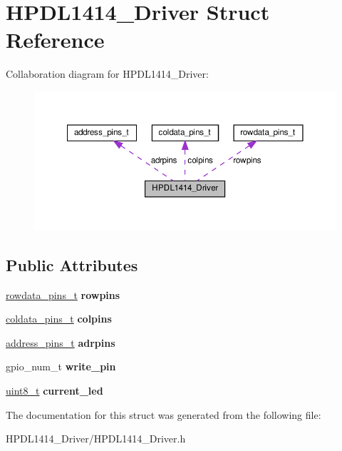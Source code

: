 \hypertarget{structHPDL1414__Driver}{}\section{H\+P\+D\+L1414\+\_\+\+Driver Struct Reference}
\label{structHPDL1414__Driver}


Collaboration diagram for H\+P\+D\+L1414\+\_\+\+Driver\+:\nopagebreak
\begin{figure}[H]
\begin{center}
\leavevmode
\includegraphics[width=350pt]{structHPDL1414__Driver__coll__graph}
\end{center}
\end{figure}
\subsection*{Public Attributes}
\begin{DoxyCompactItemize}
\item 
\mbox{\label{structHPDL1414__Driver_a5524038b70f5bd39e288eb41e37c56a6}} 
\hyperlink{structrowdata__pins__t}{rowdata\+\_\+pins\+\_\+t} {\bfseries rowpins}
\item 
\mbox{\label{structHPDL1414__Driver_acca32a90c225cf8ab271588f6cd35206}} 
\hyperlink{structcoldata__pins__t}{coldata\+\_\+pins\+\_\+t} {\bfseries colpins}
\item 
\mbox{\label{structHPDL1414__Driver_ab048419e19192afc40fe92e918ee8f47}} 
\hyperlink{structaddress__pins__t}{address\+\_\+pins\+\_\+t} {\bfseries adrpins}
\item 
\mbox{\label{structHPDL1414__Driver_ab3225ee4547f8fddba7acdc88117e873}} 
gpio\+\_\+num\+\_\+t {\bfseries write\+\_\+pin}
\item 
\mbox{\label{structHPDL1414__Driver_ae4ea4f16a3407a0126cf16b569dec815}} 
\hyperlink{vl53l0x__types_8h_aba7bc1797add20fe3efdf37ced1182c5}{uint8\+\_\+t} {\bfseries current\+\_\+led}
\end{DoxyCompactItemize}


The documentation for this struct was generated from the following file\+:\begin{DoxyCompactItemize}
\item 
H\+P\+D\+L1414\+\_\+\+Driver/H\+P\+D\+L1414\+\_\+\+Driver.\+h\end{DoxyCompactItemize}

